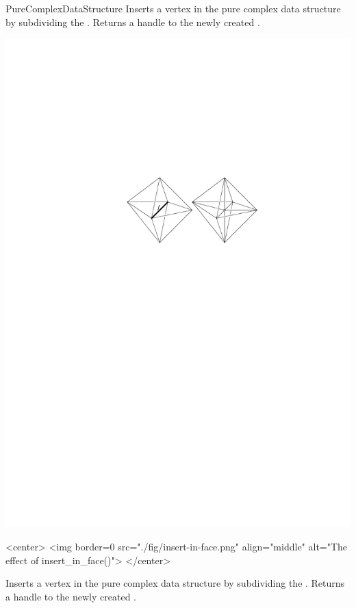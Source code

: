 \begin{ccRefConcept}{PureComplexDataStructure}
{Inserts a vertex in the pure complex data structure by subdividing the
. Returns a handle to the newly created .}
\begin{ccTexOnly}
\begin{center}
\includegraphics{Pure_complex_ref/fig/insert-in-face.pdf}
\end{center}
\end{ccTexOnly}
\begin{ccHtmlOnly}
<center>
<img border=0 src="./fig/insert-in-face.png" align="middle" alt="The effect of insert_in_face()">
</center>
\end{ccHtmlOnly}

{Inserts a vertex in the pure complex data structure by subdividing the
. Returns a handle to the newly created .}


\end{ccRefConcept}
